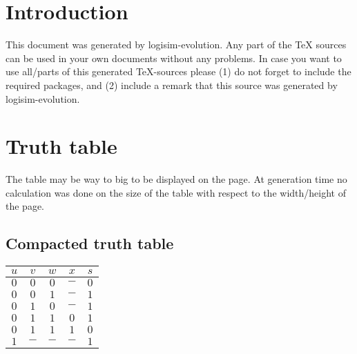 \documentclass [15pt,a4paper,twoside]{article}
\begin{document}
\section{Introduction}
This document was generated by logisim-evolution. Any part of the TeX sources can be used in your own documents without any problems. In case you want to use all/parts of this generated TeX-sources please (1) do not forget to include the required packages, and (2) include a remark that this source was generated by logisim-evolution.
\section{Truth table}
The table may be way to big to be displayed on the page. At generation time no calculation was done on the size of the table with respect to the width/height of the page.
\subsection{Compacted truth table}
\begin{center}
\begin{tabular}{cccc|c}
$u$&$v$&$w$&$x$&$s$\\
\hline
$0$&$0$&$0$&$-$&$0$\\
$0$&$0$&$1$&$-$&$1$\\
$0$&$1$&$0$&$-$&$1$\\
$0$&$1$&$1$&$0$&$1$\\
$0$&$1$&$1$&$1$&$0$\\
$1$&$-$&$-$&$-$&$1$\\

\end{tabular}
\end{center}
\end{document}

